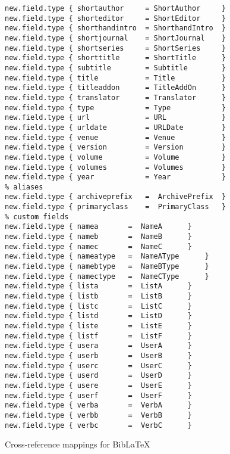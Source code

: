 \documentclass[11pt,a4paper]{scrbook}
\makeatletter
\newcommand\bibLaTeX{Bib\-\LaTeX\index{biblatex@Bib\-\LaTeX}}
\makeatother
\begin{document}
\begin{lstlisting}[language=BibTool]
new.field.type { shortauthor     = ShortAuthor     }
new.field.type { shorteditor     = ShortEditor     }
new.field.type { shorthandintro  = ShorthandIntro  }
new.field.type { shortjournal    = ShortJournal    }
new.field.type { shortseries     = ShortSeries     }
new.field.type { shorttitle      = ShortTitle      }
new.field.type { subtitle        = Subtitle        }
new.field.type { title           = Title           }
new.field.type { titleaddon      = TitleAddOn      }
new.field.type { translator      = Translator      }
new.field.type { type            = Type            }
new.field.type { url             = URL             }
new.field.type { urldate         = URLDate         }
new.field.type { venue           = Venue           }
new.field.type { version         = Version         }
new.field.type { volume          = Volume          }
new.field.type { volumes         = Volumes         }
new.field.type { year            = Year            }
% aliases
new.field.type { archiveprefix	 =  ArchivePrefix  }
new.field.type { primaryclass	 =  PrimaryClass   }
% custom fields
new.field.type { namea		 =  NameA	   }
new.field.type { nameb		 =  NameB	   }
new.field.type { namec		 =  NameC	   }
new.field.type { nameatype	 =  NameAType	   }
new.field.type { namebtype	 =  NameBType	   }
new.field.type { namectype	 =  NameCType	   }
new.field.type { lista		 =  ListA	   }
new.field.type { listb		 =  ListB	   }
new.field.type { listc		 =  ListC	   }
new.field.type { listd		 =  ListD	   }
new.field.type { liste		 =  ListE	   }
new.field.type { listf		 =  ListF	   }
new.field.type { usera		 =  UserA	   }
new.field.type { userb		 =  UserB	   }
new.field.type { userc		 =  UserC	   }
new.field.type { userd		 =  UserD	   }
new.field.type { usere		 =  UserE	   }
new.field.type { userf		 =  UserF	   }
new.field.type { verba		 =  VerbA	   }
new.field.type { verbb		 =  VerbB	   }
new.field.type { verbc		 =  VerbC	   }
\end{lstlisting}

Cross-reference mappings for \bibLaTeX{}
\end{document}
